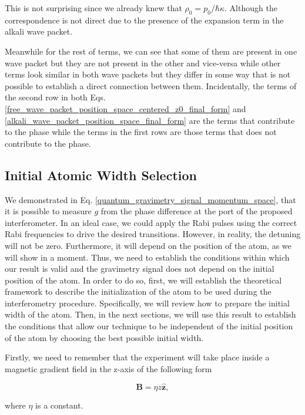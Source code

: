 \documentclass{article}
\begin{document}
This is not surprising since we already knew that $\rho_{0}=p_{0}/\hbar \kappa$. Although the correspondence is not direct due to the presence of the expansion term in the alkali wave packet.

Meanwhile for the rest of terms, we can see that some of them are present in one wave packet but they are not present in the other and vice-versa while other terms look similar in both wave packets but they differ in some way that is not possible to establish a direct connection between them. Incidentally, the terms of the second row in both Eqs. \ref{free_wave_packet_position_space_centered_z0_final_form} and \ref{alkali_wave_packet_position_space_final_form} are the terms that contribute to the phase while the terms in the first rows are those terms that does not contribute to the phase.

\subsection{Initial Atomic Width Selection}
We demonstrated in Eq. \ref{quantum_gravimetry_signal_momentum_space}, that it is possible to measure $g$ from the phase difference at the port of the proposed interferometer. In an ideal case, we could apply the Rabi pulses using the correct Rabi frequencies to drive the desired transitions. However, in reality, the detuning will not be zero. Furthermore, it will depend on the position of the atom, as we will show in a moment. Thus, we need to establish the conditions within which our result is valid and the gravimetry signal does not depend on the initial position of the atom.
In order to do so, first, we will establish the theoretical framework to describe the initialization of the atom to be used during the interferometry procedure. Specifically, we will review how to prepare the initial width of the atom. Then, in the next sections, we will use this result to establish the conditions that allow our technique to be independent of the initial position of the atom  by choosing the best possible initial width.

Firstly, we need to remember that the experiment will take place inside a magnetic gradient field in the z-axis of the following form

\begin{equation*}
\textbf{B} = \eta z \hat{\textbf{z}},
\end{equation*}

where $\eta$ is a constant.
\end{document}
